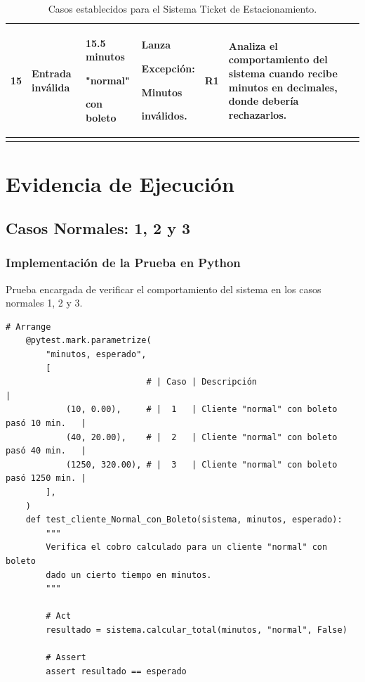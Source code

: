 \documentclass[11pt,letterpaper]{article}
\begin{document}
\begin{longtable}{
    |C{1.00cm}
    |L{1.95cm}
    |L{2.30cm}
    |L{2.00cm}
    |L{1.55cm}
    |L{4.35cm}|
}
15 &
Entrada inválida &
15.5 minutos

"normal"

con boleto &
Lanza

Excepción:

Minutos

inválidos. &
R1 &
Analiza el comportamiento del sistema cuando recibe minutos en decimales, donde debería rechazarlos.
\\
\hline



\caption{Casos establecidos para el Sistema Ticket de Estacionamiento.}
\label{tab:casos-ticket}

\end{longtable}

\nomakegapedcells

\endgroup
\section{Evidencia de Ejecución}
\label{sec:org45bd9e6}

\subsection{Casos Normales: 1, 2 y 3}
\label{sec:orgae4e4ec}

\subsubsection{Implementación de la Prueba en Python}
\label{sec:org53ca47f}

Prueba encargada de verificar el comportamiento del sistema en los casos normales 1, 2 y 3.

\vspace{\baselineskip}


\begin{lstlisting}[style=practica]
    # Arrange
    @pytest.mark.parametrize(
        "minutos, esperado",
        [
                            # | Caso | Descripción                                |
            (10, 0.00),     # |  1   | Cliente "normal" con boleto pasó 10 min.   |
            (40, 20.00),    # |  2   | Cliente "normal" con boleto pasó 40 min.   |
            (1250, 320.00), # |  3   | Cliente "normal" con boleto pasó 1250 min. |
        ],
    )
    def test_cliente_Normal_con_Boleto(sistema, minutos, esperado):
        """
        Verifica el cobro calculado para un cliente "normal" con boleto
        dado un cierto tiempo en minutos.
        """

        # Act
        resultado = sistema.calcular_total(minutos, "normal", False)

        # Assert
        assert resultado == esperado
\end{lstlisting}
\end{document}
